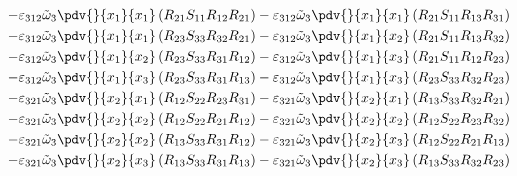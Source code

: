 \begin{equation}
	\begin{split}
		-\varepsilon_{312}\tilde{\omega}_{3}\pdv{}{x_{1}}{x_{1}}\left(R_{21}S_{11}R_{12}R_{21}\right)		-\varepsilon_{312}\tilde{\omega}_{3}\pdv{}{x_{1}}{x_{1}}\left(R_{21}S_{11}R_{13}R_{31}\right)\\
		-\varepsilon_{312}\tilde{\omega}_{3}\pdv{}{x_{1}}{x_{1}}\left(R_{23}S_{33}R_{32}R_{21}\right)		-\varepsilon_{312}\tilde{\omega}_{3}\pdv{}{x_{1}}{x_{2}}\left(R_{21}S_{11}R_{13}R_{32}\right)\\
		-\varepsilon_{312}\tilde{\omega}_{3}\pdv{}{x_{1}}{x_{2}}\left(R_{23}S_{33}R_{31}R_{12}\right)		-\varepsilon_{312}\tilde{\omega}_{3}\pdv{}{x_{1}}{x_{3}}\left(R_{21}S_{11}R_{12}R_{23}\right)\\
		-\varepsilon_{312}\tilde{\omega}_{3}\pdv{}{x_{1}}{x_{3}}\left(R_{23}S_{33}R_{31}R_{13}\right)		-\varepsilon_{312}\tilde{\omega}_{3}\pdv{}{x_{1}}{x_{3}}\left(R_{23}S_{33}R_{32}R_{23}\right)\\
		-\varepsilon_{321}\tilde{\omega}_{3}\pdv{}{x_{2}}{x_{1}}\left(R_{12}S_{22}R_{23}R_{31}\right)		-\varepsilon_{321}\tilde{\omega}_{3}\pdv{}{x_{2}}{x_{1}}\left(R_{13}S_{33}R_{32}R_{21}\right)\\
		-\varepsilon_{321}\tilde{\omega}_{3}\pdv{}{x_{2}}{x_{2}}\left(R_{12}S_{22}R_{21}R_{12}\right)		-\varepsilon_{321}\tilde{\omega}_{3}\pdv{}{x_{2}}{x_{2}}\left(R_{12}S_{22}R_{23}R_{32}\right)\\
		-\varepsilon_{321}\tilde{\omega}_{3}\pdv{}{x_{2}}{x_{2}}\left(R_{13}S_{33}R_{31}R_{12}\right)		-\varepsilon_{321}\tilde{\omega}_{3}\pdv{}{x_{2}}{x_{3}}\left(R_{12}S_{22}R_{21}R_{13}\right)\\
		-\varepsilon_{321}\tilde{\omega}_{3}\pdv{}{x_{2}}{x_{3}}\left(R_{13}S_{33}R_{31}R_{13}\right)		-\varepsilon_{321}\tilde{\omega}_{3}\pdv{}{x_{2}}{x_{3}}\left(R_{13}S_{33}R_{32}R_{23}\right)\\
	\end{split}
\end{equation}

